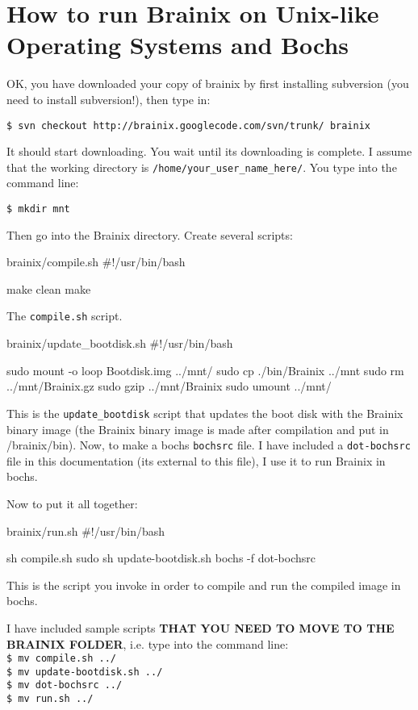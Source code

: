\chapter{How to run Brainix on Unix-like Operating Systems and Bochs}

OK, you have downloaded your copy of brainix by first installing subversion (you need to install subversion!), then type in:

\verb|$ svn checkout http://brainix.googlecode.com/svn/trunk/ brainix|

It should start downloading. You wait until its downloading is complete. I assume that the working directory is \verb|/home/your_user_name_here/|. You type into the command line:

\verb|$ mkdir mnt|

Then go into the Brainix directory. Create several scripts:
\begin{code}{brainix/compile.sh}
#!/usr/bin/bash

make clean
make
\end{code}
The \verb|compile.sh| script.
\begin{code}{brainix/update\_bootdisk.sh}
#!/usr/bin/bash

sudo mount -o loop Bootdisk.img ../mnt/
sudo cp ./bin/Brainix ../mnt
sudo rm ../mnt/Brainix.gz
sudo gzip ../mnt/Brainix
sudo umount ../mnt/
\end{code}
This is the \verb|update_bootdisk| script that updates the boot disk with the Brainix binary image (the Brainix binary image is made after compilation and put in /brainix/bin). Now, to make a bochs \verb|bochsrc| file. I have included a \verb|dot-bochsrc| file in this documentation (its external to this file), I use it to run Brainix in bochs.

Now to put it all together:
\begin{code}{brainix/run.sh}
#!/usr/bin/bash

sh compile.sh
sudo sh update-bootdisk.sh
bochs -f dot-bochsrc
\end{code}
This is the script you invoke in order to compile and run the compiled image in bochs.

I have included sample scripts \textbf{THAT YOU NEED TO MOVE TO THE BRAINIX FOLDER}, i.e. type into the command line:
\\
\verb|$ mv compile.sh ../|
\\
\verb|$ mv update-bootdisk.sh ../|
\\
\verb|$ mv dot-bochsrc ../|
\\
\verb|$ mv run.sh ../|

